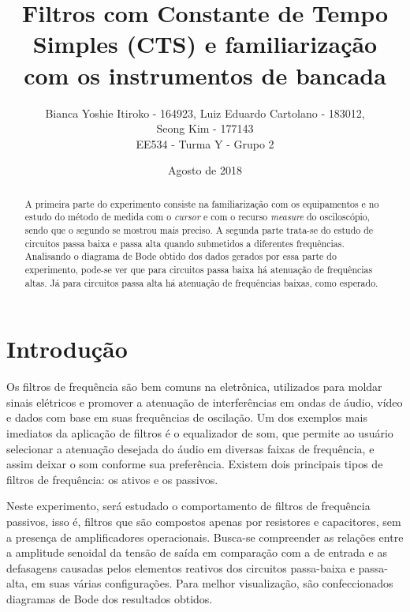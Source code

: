 \documentclass{article}
\begin{document}
\title{ Filtros com Constante de Tempo Simples (CTS) e familiarização com os instrumentos de bancada}
\author{Bianca Yoshie Itiroko - 164923, Luiz Eduardo Cartolano - 183012, \\ Seong Kim - 177143 \\ EE534 - Turma Y - Grupo 2}
\date{Agosto de 2018}

\maketitle

\begin{abstract}
    A primeira parte do experimento consiste na familiarização com os equipamentos e no estudo do método de medida com o \emph{cursor} e com o recurso \emph{measure} do osciloscópio, sendo que o segundo se mostrou mais preciso. A segunda parte trata-se do estudo de circuitos passa baixa e passa alta quando submetidos a diferentes frequências. Analisando o diagrama de Bode obtido dos dados gerados por essa parte do experimento, pode-se ver que para circuitos passa baixa há atenuação de frequências altas. Já para circuitos passa alta há atenuação de frequências baixas, como esperado.
\end{abstract}

\section{Introdução}
Os filtros de frequência são bem comuns na eletrônica, utilizados para moldar sinais elétricos e promover a atenuação de interferências em ondas de áudio, vídeo e dados com base em suas frequências de oscilação. Um dos exemplos mais imediatos da aplicação de filtros é o equalizador de som, que permite ao usuário selecionar a atenuação desejada  do áudio em diversas faixas de frequência, e assim deixar o som conforme sua preferência. Existem dois principais tipos de filtros de frequência: os ativos e os passivos.

Neste experimento, será estudado o comportamento de filtros de frequência passivos, isso é, filtros que são compostos apenas por resistores e capacitores, sem a presença de amplificadores operacionais. Busca-se compreender as relações entre a amplitude senoidal da tensão de saída em comparação com a de entrada e as defasagens causadas pelos elementos reativos dos circuitos passa-baixa e passa-alta, em suas várias configurações. Para melhor visualização, são confeccionados diagramas de Bode dos resultados obtidos.
\end{document}
